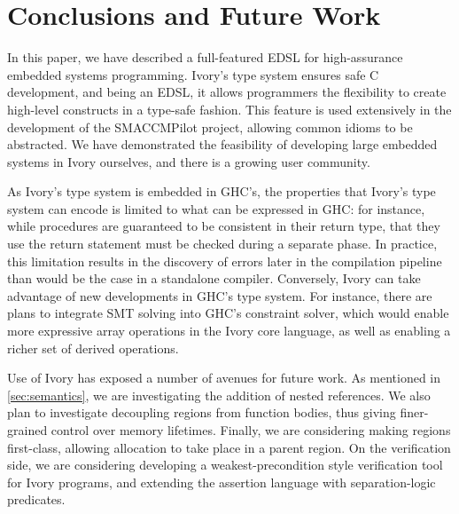 \section{Conclusions and Future Work}
\label{sec:conclusion}

In this paper, we have described a full-featured EDSL for high-assurance
embedded systems programming. Ivory's type system ensures safe C development,
and being an EDSL, it allows programmers the flexibility to create high-level
constructs in a type-safe fashion. This feature is used extensively in the
development of the SMACCMPilot project, allowing common idioms to be abstracted.
We have demonstrated the feasibility of developing large embedded systems in
Ivory ourselves, and there is a growing user community.

As Ivory's type system is embedded in GHC's, the properties that Ivory's type
system can encode is limited to what can be expressed in GHC: for instance,
while procedures are guaranteed to be consistent in their return type, that they
use the return statement must be checked during a separate phase.  In practice,
this limitation results in the discovery of errors later in the compilation
pipeline than would be the case in a standalone compiler.  Conversely, Ivory can
take advantage of new developments in GHC's type system.  For instance, there
are plans to integrate SMT solving into GHC's constraint solver, which would
enable more expressive array operations in the Ivory core language, as well as
enabling a richer set of derived operations.

Use of Ivory has exposed a number of avenues for future work. As mentioned in
\autoref{sec:semantics}, we are investigating the addition of nested references.
We also plan to investigate decoupling regions from function bodies, thus giving
finer-grained control over memory lifetimes.  Finally, we are considering making
regions first-class, allowing allocation to take place in a parent region.  On
the verification side, we are considering developing a weakest-precondition
style verification tool for Ivory programs, and extending the assertion language
with separation-logic predicates.

